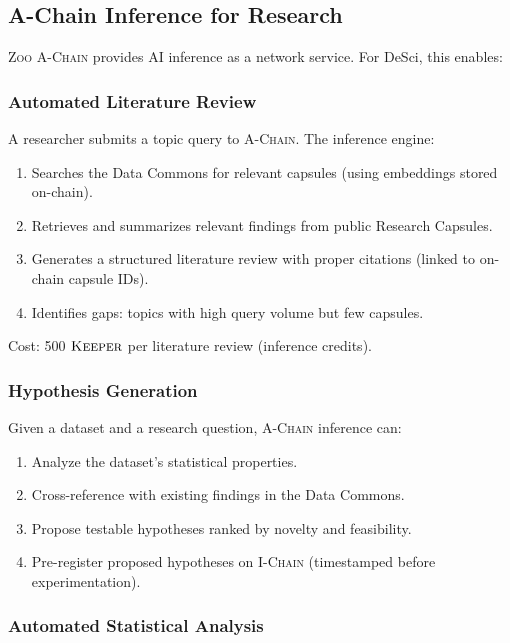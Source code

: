 \documentclass[11pt,letterpaper]{article}
\theoremstyle{definition}
\theoremstyle{remark}
\newcommand{\Zoo}{\textsc{Zoo}}
\newcommand{\AChain}{\textsc{A-Chain}}
\newcommand{\IChain}{\textsc{I-Chain}}
\newcommand{\KEEPER}{\textsc{Keeper}}
\begin{document}
\subsection{A-Chain Inference for Research}

\Zoo{} \AChain{} provides AI inference as a network service. For DeSci, this enables:

\subsubsection{Automated Literature Review}

A researcher submits a topic query to \AChain{}. The inference engine:

\begin{enumerate}
    \item Searches the Data Commons for relevant capsules (using embeddings stored on-chain).
    \item Retrieves and summarizes relevant findings from public Research Capsules.
    \item Generates a structured literature review with proper citations (linked to on-chain capsule IDs).
    \item Identifies gaps: topics with high query volume but few capsules.
\end{enumerate}

Cost: 500 $\KEEPER$ per literature review (inference credits).

\subsubsection{Hypothesis Generation}

Given a dataset and a research question, \AChain{} inference can:

\begin{enumerate}
    \item Analyze the dataset's statistical properties.
    \item Cross-reference with existing findings in the Data Commons.
    \item Propose testable hypotheses ranked by novelty and feasibility.
    \item Pre-register proposed hypotheses on \IChain{} (timestamped before experimentation).
\end{enumerate}

\subsubsection{Automated Statistical Analysis}
\end{document}
